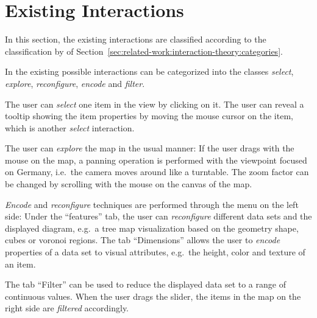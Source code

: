 \section{Existing Interactions}
In this section, the existing interactions are classified according to the classification by \textcite{Yi2007} of Section~\ref{sec:related-work:interaction-theory:categories}.

In the existing \visan{} possible interactions can be categorized into the classes \emph{select}, \emph{explore}, \emph{reconfigure}, \emph{encode} and \emph{filter}.

The user can \emph{select} one item in the view by clicking on it.
The user can reveal a tooltip showing the item properties by moving the mouse cursor on the item, which is another \emph{select} interaction.

The user can \emph{explore} the map in the usual manner:
If the user drags with the mouse on the map, a panning operation is performed with the viewpoint focused on Germany, i.e.\ the camera moves around like a turntable.
The zoom factor can be changed by scrolling with the mouse on the canvas of the map.

\emph{Encode} and \emph{reconfigure} techniques are performed through the menu on the left side:
Under the ``features'' tab, the user can \emph{reconfigure} different data sets and the displayed diagram, e.g.\ a tree map visualization based on the geometry shape, cubes or voronoi regions.
The tab ``Dimensions'' allows the user to \emph{encode} properties of a data set to visual attributes, e.g.\ the height, color and texture of an item.

The tab ``Filter'' can be used to reduce the displayed data set to a range of continuous values.
When the user drags the slider, the items in the map on the right side are \emph{filtered} accordingly.


